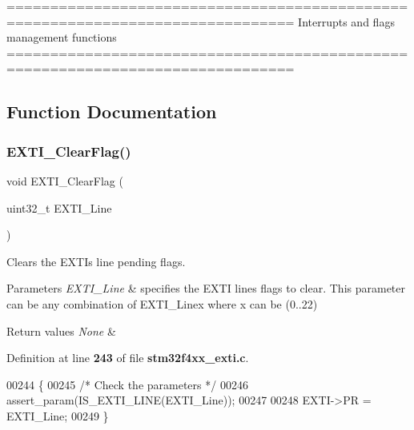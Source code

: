 \begin{DoxyVerb} ===============================================================================
                  Interrupts and flags management functions
 ===============================================================================  \end{DoxyVerb}
 

\subsection{Function Documentation}
\mbox{\label{group__EXTI__Group2_ga8e07aaaa286dea4803605d5968850a92}} 
\subsubsection{E\+X\+T\+I\+\_\+\+Clear\+Flag()}
{\footnotesize\ttfamily void E\+X\+T\+I\+\_\+\+Clear\+Flag (\begin{DoxyParamCaption}\item[{uint32\+\_\+t}]{E\+X\+T\+I\+\_\+\+Line }\end{DoxyParamCaption})}



Clears the E\+X\+TI\textquotesingle{}s line pending flags. 


\begin{DoxyParams}{Parameters}
{\em E\+X\+T\+I\+\_\+\+Line} & specifies the E\+X\+TI lines flags to clear. This parameter can be any combination of E\+X\+T\+I\+\_\+\+Linex where x can be (0..22) \\
\hline
\end{DoxyParams}

\begin{DoxyRetVals}{Return values}
{\em None} & \\
\hline
\end{DoxyRetVals}


Definition at line \textbf{ 243} of file \textbf{ stm32f4xx\+\_\+exti.\+c}.


\begin{DoxyCode}
00244 \{
00245   \textcolor{comment}{/* Check the parameters */}
00246   assert_param(IS_EXTI_LINE(EXTI\_Line));
00247   
00248   EXTI->PR = EXTI\_Line;
00249 \}
\end{DoxyCode}
\mbox{\label{group__EXTI__Group2_ga3652a7e682728b310c124e7e974d1468}} 
